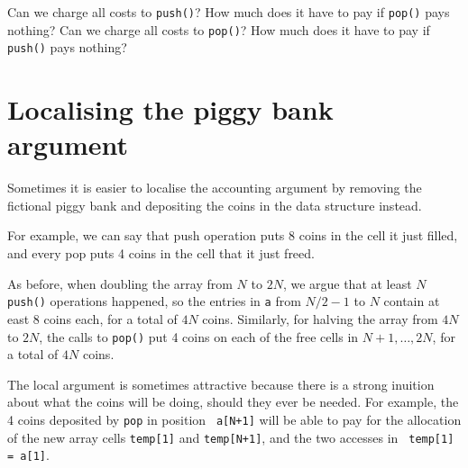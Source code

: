 \documentclass{tstextbook}
\begin{document}
\begin{ExerciseList}
  \Exercise \label{ex: only push}Can we charge all costs to
  \texttt{push()}? How much does it have to pay if \texttt{pop()} pays nothing?
  \Exercise Can we charge all costs to
  \texttt{pop()}? How much does it have to pay if \texttt{push()} pays nothing?
\end{ExerciseList}

\section{Localising the piggy bank argument}

Sometimes it is easier to localise the accounting argument by removing
the fictional piggy bank and depositing the coins in the data
structure instead.

For example, we can say that push operation puts 8 coins in the cell
it just filled, and every pop puts 4 coins in the cell that it just
freed. 

As before, when doubling the array from $N$ to $2N$, we argue that at
least $N$ {\tt push()} operations happened, so the entries in {\tt a}
from $N/2-1$ to $N$ contain at east 8 coins each, for a total of $4N$
coins. Similarly, for halving the array from $4N$ to $2N$, the calls
to {\tt pop()} put 4 coins on each of the free cells in $N+1,\ldots,
2N$, for a total of $4N$ coins. 

The local argument is sometimes attractive because there is a strong
inuition about what the coins will be doing, should they ever be
needed.  
For example, the 4 coins deposited by {\tt pop} in position {\tt
  a[N+1]} will be able to pay for the allocation of the new array
cells {\tt temp[1]} and {\tt temp[N+1]}, and the two accesses in {\tt
  temp[1] = a[1]}.
\end{document}
